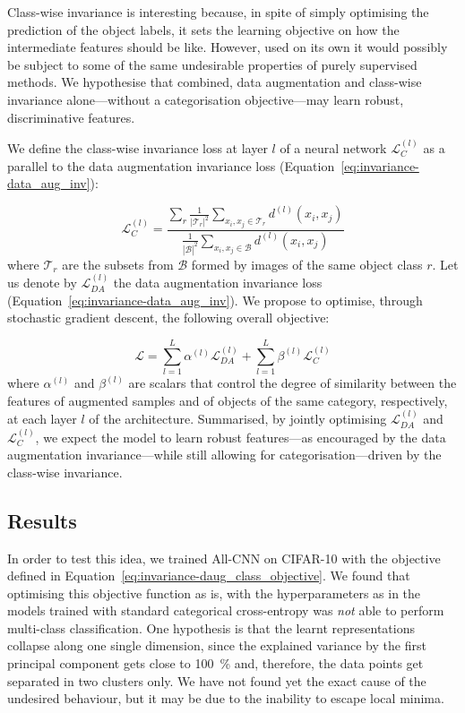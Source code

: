 {Class-wise invariance is interesting because, in spite of simply optimising the prediction of the object labels, it sets the learning objective on how the intermediate features should be like. However, used on its own it would possibly be subject to some of the same undesirable properties of purely supervised methods. We hypothesise that combined, data augmentation and class-wise invariance alone---without a categorisation objective---may learn robust, discriminative features. 

We define the class-wise invariance loss at layer $l$ of a neural network $\mathcal{L}_{C}^{(l)}$ as a parallel to the data augmentation invariance loss (Equation~\ref{eq:invariance-data_aug_inv}):

\begin{equation}
\label{eq:invariance-class_wise_inv}
 \mathcal{L}_{C}^{(l)} = \frac{\sum_{r}\frac{1}{|\mathcal{T}_{r}|^2}\sum_{x_i, x_j \in \mathcal{T}_{r}}d^{(l)}(x_{i}, x_{j})}{\frac{1}{|\mathcal{B}|^2}\sum_{x_i, x_j \in \mathcal{B}}d^{(l)}(x_{i}, x_{j})}
\end{equation}
%
where $\mathcal{T}_{r}$ are the subsets from $\mathcal{B}$ formed by images of the same object class $r$. Let us denote by $\mathcal{L}_{DA}^{(l)}$ the data augmentation invariance loss (Equation~\ref{eq:invariance-data_aug_inv}). We propose to optimise, through stochastic gradient descent, the following overall objective:

\begin{equation}
\label{eq:invariance-daug_class_objective}
 \mathcal{L} = \sum_{l=1}^{L}\alpha^{(l)}\mathcal{L}_{DA}^{(l)} + \sum_{l=1}^{L}\beta^{(l)}\mathcal{L}_{C}^{(l)}
\end{equation}
%
where $\alpha^{(l)}$ and $\beta^{(l)}$ are scalars that control the degree of similarity between the features of augmented samples and of objects of the same category, respectively, at each layer $l$ of the architecture. Summarised, by jointly optimising $\mathcal{L}_{DA}^{(l)}$ and $\mathcal{L}_{C}^{(l)}$, we expect the model to learn robust features---as encouraged by the data augmentation invariance---while still allowing for categorisation---driven by the class-wise invariance.

\subsection{Results}
\label{sec:invariance-classwise_results}
In order to test this idea, we trained All-CNN on CIFAR-10 with the objective defined in Equation~\ref{eq:invariance-daug_class_objective}. We found that optimising this objective function as is, with the hyperparameters as in the models trained with standard categorical cross-entropy was \textit{not} able to perform multi-class classification. One hypothesis is that the learnt representations collapse along one single dimension, since the explained variance by the first principal component gets close to 100~\% and, therefore, the data points get separated in two clusters only. We have not found yet the exact cause of the undesired behaviour, but it may be due to the inability to escape local minima.

}
